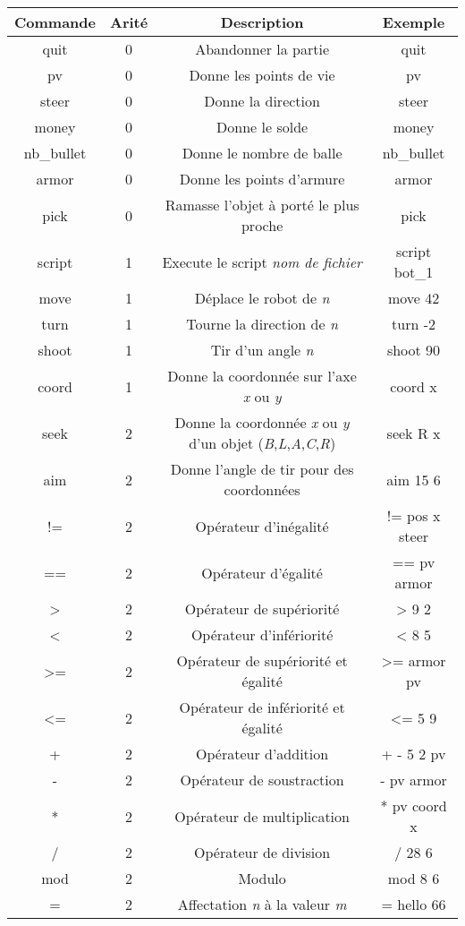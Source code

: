 \documentclass[a4paper, 11pt]{article}
\begin{document}
\begin{tabular}{|c|c|c|c|}
   \hline
   Commande & Arité & Description & Exemple \\
	 \hline
   quit & 0 & Abandonner la partie & quit \\
   \hline
   pv & 0 & Donne les points de vie & pv \\
   \hline
	 steer & 0 & Donne la direction & steer \\
	 \hline
   money & 0 & Donne le solde & money \\
   \hline
   nb\_bullet & 0 & Donne le nombre de balle & nb\_bullet \\
   \hline
	 armor & 0 & Donne les points d'armure & armor \\
	 \hline
	 pick & 0 & Ramasse l'objet à porté le plus proche & pick \\
   \hline
	 script & 1 & Execute le script \emph{nom de fichier} & script bot\_1 \\
   \hline
   move & 1 & Déplace le robot de \emph{n} & move 42 \\
   \hline
	 turn & 1 & Tourne la direction de \emph{n} & turn -2 \\
	 \hline
   shoot & 1 & Tir d'un angle \emph{n} & shoot 90 \\
   \hline
   coord & 1 & Donne la coordonnée sur l'axe \emph{x} ou \emph{y} & coord x \\
   \hline
	 seek & 2 & Donne la coordonnée \emph{x} ou \emph{y} d'un objet (\emph{B},\emph{L},\emph{A},\emph{C},\emph{R}) & seek R x \\
   \hline
	 aim & 2 & Donne l'angle de tir pour des coordonnées & aim 15 6 \\
   \hline
	 != & 2 & Opérateur d'inégalité & != pos x steer \\
	 \hline
   == & 2 & Opérateur d'égalité  & == pv armor \\
   \hline
   > & 2 & Opérateur de supériorité  & > 9 2 \\
   \hline
	 < & 2 & Opérateur d'infériorité  & < 8 5 \\
	 \hline
   >= & 2 & Opérateur de supériorité et égalité  & >= armor pv \\
   \hline
   <= & 2 & Opérateur de infériorité et égalité  & <= 5 9 \\
   \hline
	 + & 2 & Opérateur d'addition & + - 5 2 pv \\
	 \hline
   - & 2 & Opérateur de soustraction & - pv armor \\
   \hline
   * & 2 & Opérateur de multiplication & * pv coord x \\
   \hline
	 / & 2 & Opérateur de division & / 28 6 \\
	 \hline
   mod & 2 & Modulo & mod 8 6 \\
   \hline
   = & 2 & Affectation \emph{n} à la valeur \emph{m}  & = hello 66 \\
   \hline
\end{tabular}
\end{document}
